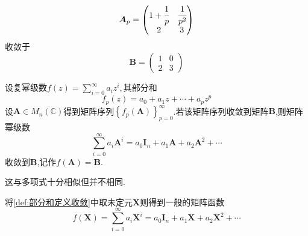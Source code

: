 \begin{brown}
    \begin{example}
        \[
        \bm{A}_p=\begin{pmatrix}
            1+\cfrac{1}{p}&\cfrac{1}{p^2}\\
            2&3
        \end{pmatrix}
        \]收敛于\[
        \bm{B}=\begin{pmatrix}
            1&0\\
            2&3
        \end{pmatrix}
        \]
    \end{example}
\end{brown}
\begin{formal}
    \begin{definition}[部分和定义收敛]\label{def:部分和定义收敛}
        设复幂级数$\displaystyle f\left(z\right)=\sum_{i=0}^{\infty}a_iz^i,$其部分和\[
        f_p\left(z\right)=a_0+a_1z+\cdots+a_pz^p
        \]设$\bm{A}\in M_n\left(\mathbb{C}\right)$得到矩阵序列$\displaystyle \left\{
            f_p\left(\bm{A}\right)
        \right\}_{p=0}^{\infty}$.若该矩阵序列收敛到矩阵$\bm{B}$,则矩阵幂级数\[
        \sum_{i=0}^{\infty}a_i\bm{A}^i=a_0\bm{I}_n+a_1\bm{A}+a_2\bm{A}^2+\cdots
        \]收敛到$\bm{B}$,记作$f\left(\bm{A}\right)=\bm{B}.$
    \end{definition}
\end{formal}
\begin{red}
    \begin{remark}
        这与多项式十分相似但并不相同.
    \end{remark}
\end{red}
\begin{formal}
    \begin{definition}[矩阵函数的定义]\label{def:矩阵函数的定义}
        将\cref{def:部分和定义收敛}中取未定元$\bm{X}$则得到一般的矩阵函数\[
        f\left(\bm{X}\right)=\sum_{i=0}^{\infty}a_i\bm{X}^i=a_0\bm{I}_n+a_1\bm{X}+a_2\bm{X}^2+\cdots
        \]
    \end{definition}
\end{formal}
